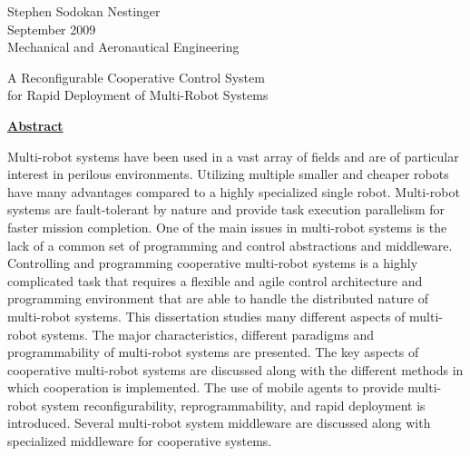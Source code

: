 \documentclass[12pt,twoside,letterpaper]{article}
\begin{document}
  \setcounter{page}{1}
  \pagestyle{fancy}
  \fancyhf{} 
  \renewcommand{\headrulewidth}{0.0pt}
  \fancyhead[RE]{\textbf{-\thepage}-}


{\raggedleft
  Stephen Sodokan Nestinger \\
  September 2009 \\
  Mechanical and Aeronautical Engineering\\
}
\hspace{.5in}

\begin{center}
  A Reconfigurable Cooperative Control System\\
  for Rapid Deployment of Multi-Robot Systems\\
\end{center}

\hspace{.5in}

\centerline{\underline{\textbf{Abstract}}}

\doublespacing
Multi-robot systems have been used in a vast array of fields and are 
  of particular interest in perilous environments.
Utilizing multiple smaller and cheaper robots have many advantages compared to 
  a highly specialized single robot.
Multi-robot systems are fault-tolerant by nature and provide task execution 
  parallelism for faster mission completion.
One of the main issues in multi-robot systems is the lack of a common set of 
  programming and control abstractions and middleware.
Controlling and programming cooperative multi-robot systems is a highly 
  complicated task that requires a flexible and agile control architecture 
  and programming environment that are able to handle the distributed nature of 
  multi-robot systems.
This dissertation studies many different aspects of multi-robot systems.
The major characteristics, different paradigms and programmability of
  multi-robot systems are presented.
The key aspects of cooperative multi-robot systems are discussed along with 
  the different methods in which cooperation is implemented.
The use of mobile agents to provide multi-robot system reconfigurability, 
  reprogrammability, and rapid deployment is introduced.
Several multi-robot system middleware are discussed along with specialized
  middleware for cooperative systems.
\end{document}
